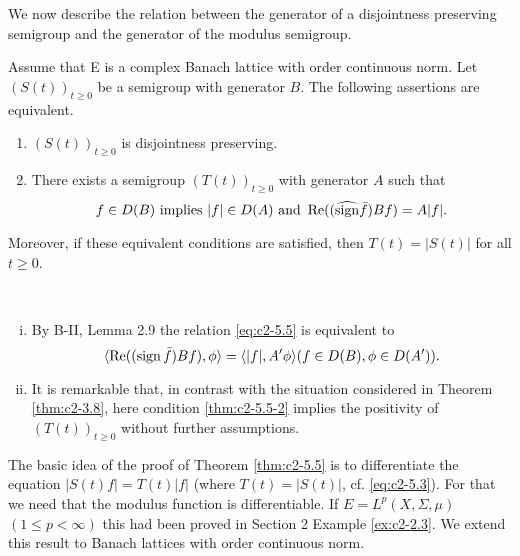 We now describe the relation between the generator of a disjointness preserving semigroup and the generator of the modulus semigroup.

\begin{theorem}\label{thm:c2-5.5}
Assume that E is a complex Banach lattice with order continuous norm. 
Let $(S(t))_{t \geq 0}$ be a semigroup with generator $B$.
The following assertions are equivalent.
\begin{enumerate}[\upshape (a)]
\item \label{thm:c2-5.5-1}
$(S(t))_{t \geq 0}$ is disjointness preserving.
\item \label{thm:c2-5.5-2}
There exists a semigroup $(T(t))_{t \geq 0}$ with generator $A$ such
that
\begin{equation}\label{eq:c2-5.5}
f \in D(B) \text{ implies } |f| \in D(A) \text{ and } \mathop{}\!\mathrm{Re}((\widehat{\operatorname{sign}}  \bar{f})Bf) = A|f|.
\end{equation}
\end{enumerate}
Moreover, if these equivalent conditions are satisfied, then
$T(t) = |S(t)|$ for all $t \geq 0$.
\end{theorem}

\begin{remark*} ~ 
\begin{enumerate}[i), wide, labelsep=.5em] %
\item  \label{enum:c2-kgk.1-1} %
By B-II, Lemma 2.9 
the relation \eqref{eq:c2-5.5} is equivalent to
\[
\langle\mathop{}\!\mathrm{Re}((\operatorname{sign}  \bar{f})Bf),\phi \rangle = \langle|f|,A'\phi\rangle  (f \in D(B), \phi \in D(A')).
\]
\item \label{enum:c2-kgk.1-2}
It is remarkable that, in contrast with the situation considered in
Theorem \ref{thm:c2-3.8}, here condition \ref{thm:c2-5.5-2}  implies the positivity of $(T(t))_{t \geq 0}$
without further assumptions.
\end{enumerate}
\end{remark*}

The basic idea of the proof of Theorem \ref{thm:c2-5.5}   is to differentiate the equation $|S(t)f| = T(t)|f|$ (where $T(t) = |S(t)|$, cf. \eqref{eq:c2-5.3}). For
that we need that the modulus function is differentiable.
If $E = L^{p}(X,\Sigma,\mu)$ $(1 \leq p < \infty)$ this had been proved in Section 2 Example 
\ref{ex:c2-2.3}.
We extend this result to Banach lattices with order continuous norm.

